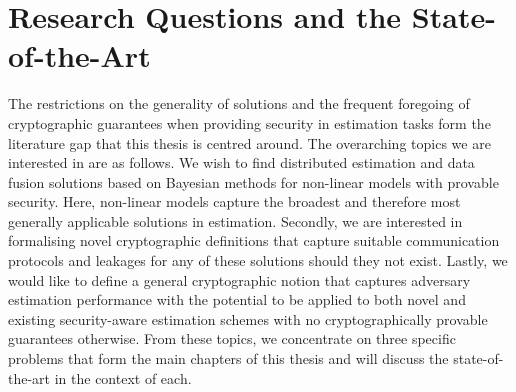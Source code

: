 % 
%                                             
%                                             
%                                             
% 

\section{Research Questions and the State-of-the-Art}\label{sec:intro:sota}
The restrictions on the generality of solutions and the frequent foregoing of cryptographic guarantees when providing security in estimation tasks form the literature gap that this thesis is centred around. The overarching topics we are interested in are as follows. We wish to find distributed estimation and data fusion solutions based on Bayesian methods for non-linear models with provable security. Here, non-linear models capture the broadest and therefore most generally applicable solutions in estimation. Secondly, we are interested in formalising novel cryptographic definitions that capture suitable communication protocols and leakages for any of these solutions should they not exist. Lastly, we would like to define a general cryptographic notion that captures adversary estimation performance with the potential to be applied to both novel and existing security-aware estimation schemes with no cryptographically provable guarantees otherwise. From these topics, we concentrate on three specific problems that form the main chapters of this thesis and will discuss the state-of-the-art in the context of each.

% 
% 

